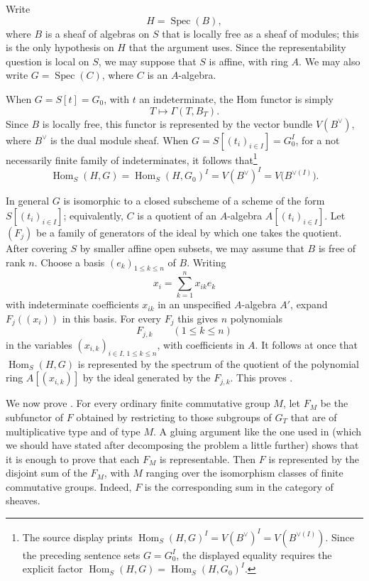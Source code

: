 Write
\[
  H=\operatorname{Spec}(B),
\]
where \(B\) is a sheaf of algebras on \(S\) that is locally free as a
sheaf of modules; this is the only hypothesis on \(H\) that the
argument uses.  Since the representability question is local on
\(S\), we may suppose that \(S\) is affine, with ring \(A\).  We may
also write \(G=\operatorname{Spec}(C)\), where \(C\) is an
\(A\)-algebra.

When \(G=S[t]=G_0\), with \(t\) an indeterminate, the Hom functor is
simply
\[
  T\longmapsto\Gamma(T,B_T).
\]
Since \(B\) is locally free, this functor is represented by the
vector bundle \(V(B^\vee)\), where \(B^\vee\) is the dual module
sheaf.  When \(G=S[(t_i)_{i\in I}]=G_0^I\), for a not necessarily
finite family of indeterminates, it follows that\footnote{The source
display prints
\(\operatorname{Hom}_S(H,G)^I=V(B^\vee)^I=V(B^{\vee(I)})\).
Since the preceding sentence sets \(G=G_0^I\), the displayed equality
requires the explicit factor
\(\operatorname{Hom}_S(H,G)=\operatorname{Hom}_S(H,G_0)^I\).}
\[
  \operatorname{Hom}_S(H,G)
  =\operatorname{Hom}_S(H,G_0)^I
  =V(B^\vee)^I
  =V\bigl(B^{\vee(I)}\bigr).
\]

In general \(G\) is isomorphic to a closed subscheme of a scheme of
the form \(S[(t_i)_{i\in I}]\); equivalently, \(C\) is a quotient of
an \(A\)-algebra \(A[(t_i)_{i\in I}]\).  Let \((F_j)\) be a family of
generators of the ideal by which one takes the quotient.  After
covering \(S\) by smaller affine open subsets, we may assume that
\(B\) is free of rank \(n\).  Choose a basis
\((e_k)_{1\leq k\leq n}\) of \(B\).  Writing
\[
  x_i=\sum_{k=1}^{n}x_{ik}e_k
\]
with indeterminate coefficients \(x_{ik}\) in an unspecified
\(A\)-algebra \(A'\), expand \(F_j((x_i))\) in this basis.  For every
\(F_j\) this gives \(n\) polynomials
\[
  F_{j,k}\qquad(1\leq k\leq n)
\]
in the variables
\((x_{i,k})_{i\in I,\,1\leq k\leq n}\), with coefficients in \(A\).
It follows at once that \(\operatorname{Hom}_S(H,G)\) is represented
by the spectrum of the quotient of the polynomial ring
\(A[(x_{i,k})]\) by the ideal generated by the \(F_{j,k}\).  This
proves \textit{}.

We now prove \textit{}.  For every ordinary finite commutative
group \(M\), let \(F_M\) be the subfunctor of \(F\) obtained by
restricting to those subgroups of \(G_T\) that are of multiplicative
type and of type \(M\).  A gluing argument like the one used in 
(which we should have stated after decomposing the problem a little
further) shows that it is enough to prove that each \(F_M\) is
representable.  Then \(F\) is represented by the disjoint sum of the
\(F_M\), with \(M\) ranging over the isomorphism classes of finite
commutative groups.  Indeed, \(F\) is the corresponding sum in the
category of sheaves.

